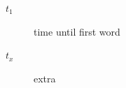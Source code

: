 \documentclass[11pt]{article}
\begin{document}
\begin{description}\item[$t_1$] time until first word\item[$t_x$] extra\end{description}
\end{document}
